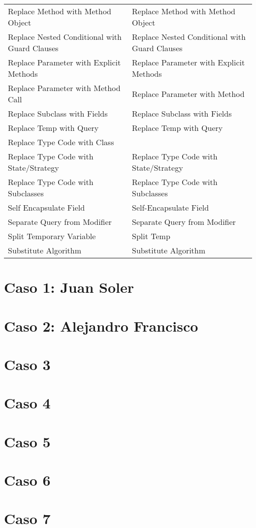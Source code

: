 \documentclass[11pt,a4paper,oneside]{book}
\begin{document}
\begin{longtable}{|p{200pt}|p{200pt}|}
    Replace Method with Method Object & Replace Method with Method Object\\ 
    Replace Nested Conditional with Guard Clauses & Replace Nested Conditional with Guard Clauses\\ 
    Replace Parameter with Explicit Methods & Replace Parameter with Explicit Methods\\ 
    Replace Parameter with Method Call & Replace Parameter with Method\\ 
    Replace Subclass with Fields & Replace Subclass with Fields\\ 
    Replace Temp with Query & Replace Temp with Query\\ 
    Replace Type Code with Class & \\ 
    Replace Type Code with State/Strategy & Replace Type Code with State/Strategy\\ 
    Replace Type Code with Subclasses & Replace Type Code with Subclasses\\ 
    Self Encapsulate Field & Self-Encapsulate Field\\ 
    Separate Query from Modifier & Separate Query from Modifier\\ 
    Split Temporary Variable & Split Temp\\ 
    Substitute Algorithm &     Substitute Algorithm\\
\end{longtable}





\chapter{Caso 1: Juan Soler}

\chapter{Caso 2: Alejandro Francisco}


\chapter {Caso 3}



\chapter {Caso 4}



\chapter {Caso 5}


\chapter {Caso 6}


\chapter {Caso 7}
\end{document}
